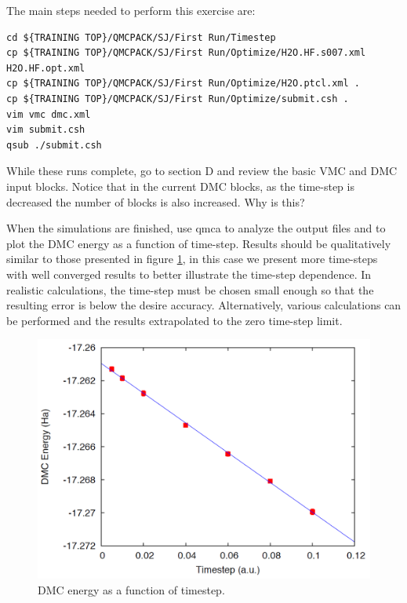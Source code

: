 The main steps needed to perform this exercise are:
\begin{shaded}
\begin{verbatim}
cd ${TRAINING TOP}/QMCPACK/SJ/First Run/Timestep
cp ${TRAINING TOP}/QMCPACK/SJ/First Run/Optimize/H2O.HF.s007.xml
H2O.HF.opt.xml
cp ${TRAINING TOP}/QMCPACK/SJ/First Run/Optimize/H2O.ptcl.xml .
cp ${TRAINING TOP}/QMCPACK/SJ/First Run/Optimize/submit.csh .
vim vmc dmc.xml
vim submit.csh
qsub ./submit.csh
\end{verbatim}
\end{shaded}
While these runs complete, go to section D and review the basic VMC and DMC input
blocks. Notice that in the current DMC blocks, as the time-step is decreased the number of
blocks is also increased. Why is this?

When the simulations are finished, use qmca to analyze the output files and to plot the
DMC energy as a function of time-step. Results should be qualitatively similar to those
presented in figure \ref{fig:lam_dmc_timestep}, in this case we present more time-steps with well converged results to
better illustrate the time-step dependence. In realistic calculations, the time-step must be
chosen small enough so that the resulting error is below the desire accuracy. Alternatively,
various calculations can be performed and the results extrapolated to the zero time-step
limit.


\begin{figure}
\begin{center}
\includegraphics[trim = 0mm 0mm 0mm 0mm, clip,width=0.75\columnwidth]{./figures/lab_advanced_molecules_dmc_timestep}
\end{center}
\caption{DMC energy as a function of timestep.
\label{fig:lam_dmc_timestep}
}
\end{figure}


